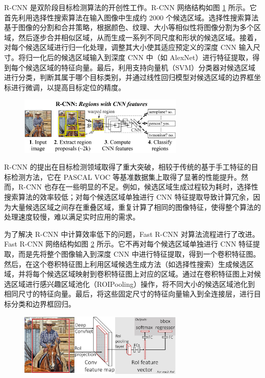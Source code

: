 R-CNN \cite{girshick2014rich, fast_rcnn,faster_rcnn, mask_rcnn}是双阶段目标检测算法的开创性工作。R-CNN 网络结构如图 \ref{fig:rcnn} 所示。它首先利用选择性搜索算法在输入图像中生成约 2000 个候选区域。选择性搜索算法基于图像的分割和合并策略，根据颜色、纹理、大小等相似性将图像分割为多个区域，然后逐步合并相似区域，从而生成一系列不同尺度和形状的候选区域。接着，对每个候选区域进行归一化处理，调整其大小使其适应预定义的深度 CNN 输入尺寸。将归一化后的候选区域输入到深度 CNN 中（如 AlexNet）进行特征提取，得到每个候选区域的特征向量。最后，利用支持向量机（SVM）\cite{svm}分类器对候选区域进行分类，判断其属于哪个目标类别，并通过线性回归模型对候选区域的边界框坐标进行微调，以提高目标定位的精度。

\begin{figure}[htbp]
    \centering
    \includegraphics[width=0.7\textwidth]{../figure/rcnn.png}
    \captionsetup{font=footnotesize}
    \label{fig:rcnn}
\end{figure}

R-CNN 的提出在目标检测领域取得了重大突破，相较于传统的基于手工特征的目标检测方法，它在 PASCAL VOC 等基准数据集上取得了显著的性能提升。然而，R-CNN 也存在一些明显的不足。例如，候选区域生成过程较为耗时，选择性搜索算法的效率较低；对每个候选区域单独进行 CNN 特征提取导致计算冗余，因为大量候选区域之间存在重叠区域，重复计算了相同的图像特征，使得整个算法的处理速度较慢，难以满足实时应用的需求。

为了解决 R-CNN 中计算效率低下的问题，Fast R-CNN 对算法流程进行了改进。Fast R-CNN 网络结构如图 \ref{fig:fastrcnn} 所示。它不再对每个候选区域单独进行 CNN 特征提取，而是先将整个图像输入到深度 CNN 中进行特征提取，得到一个卷积特征图。然后，在这个卷积特征图上利用区域候选生成方法（如选择性搜索）生成候选区域，并将每个候选区域映射到卷积特征图上对应的区域。通过在卷积特征图上对候选区域进行感兴趣区域池化（ROIPooling）操作，将不同大小的候选区域池化到相同尺寸的特征向量。最后，将这些固定尺寸的特征向量输入到全连接层，进行目标分类和边界框回归。

\begin{figure}[htbp]
    \centering
    \includegraphics[width=0.7\textwidth]{../figure/fastrcnn.png}
    \captionsetup{font=footnotesize}
    \label{fig:fastrcnn}
\end{figure}

